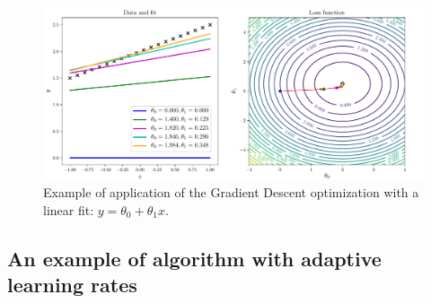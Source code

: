 \begin{figure}[H]
	\centering
	\includegraphics[width=1.0\textwidth]{Python/NN/SGD.pdf}
	\caption{Example of application of the Gradient Descent optimization with a linear fit: $y=\theta_{0} + \theta_{1}x$.}
	\label{fig:SGD}
\end{figure}





\subsection{An example of algorithm with adaptive learning rates}

